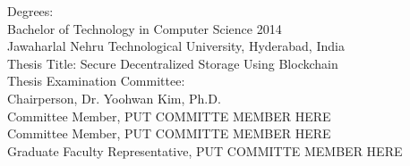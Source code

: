\documentclass[11pt,openright]{report}
\begin{document}
\noindent Degrees:\\
\indent Bachelor of Technology in Computer Science 2014\\
\indent Jawaharlal Nehru Technological University, Hyderabad, India\\

\noindent Thesis Title: Secure Decentralized Storage Using Blockchain\\

\noindent Thesis Examination Committee:\\
\indent Chairperson, Dr. Yoohwan Kim, Ph.D.\\
\indent Committee Member, PUT COMMITTE MEMBER HERE\\
\indent Committee Member, PUT COMMITTE MEMBER HERE\\
\indent Graduate Faculty Representative, PUT COMMITTE MEMBER HERE\\
\end{document}
